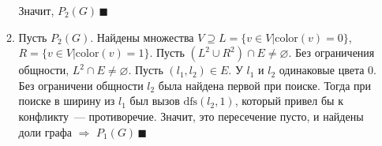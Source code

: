 \documentclass[a4paper]{article}
\begin{document}
\begin{enumerate}
\begin{enumerate}
\newline
Значит, $P_2(G)\,\blacksquare$
\item Пусть $P_2(G)$. Найдены множества $V\supseteq L=\{v\in V\big| \mbox{color}(v)=0\}$, $R=\{v\in V\big| \mbox{color}(v)=1\}$. Пусть $(L^2\cup R^2)\cap E\neq\varnothing$. Без ограничения общности, $L^2\cap E\neq\varnothing$. Пусть $(l_1,l_2)\in E$. У $l_1$ и $l_2$ одинаковые цвета $0$. Без ограничени общности $l_2$ была найдена первой при поиске. Тогда при поиске в ширину из $l_1$ был вызов $\mbox{dfs}(l_2,1)$, который привел бы к конфликту~--- противоречие. Значит, это пересечение пусто, и найдены доли графа $\Rightarrow$ $P_1(G)\,\blacksquare$
\end{enumerate}
\end{enumerate}
\end{document}
